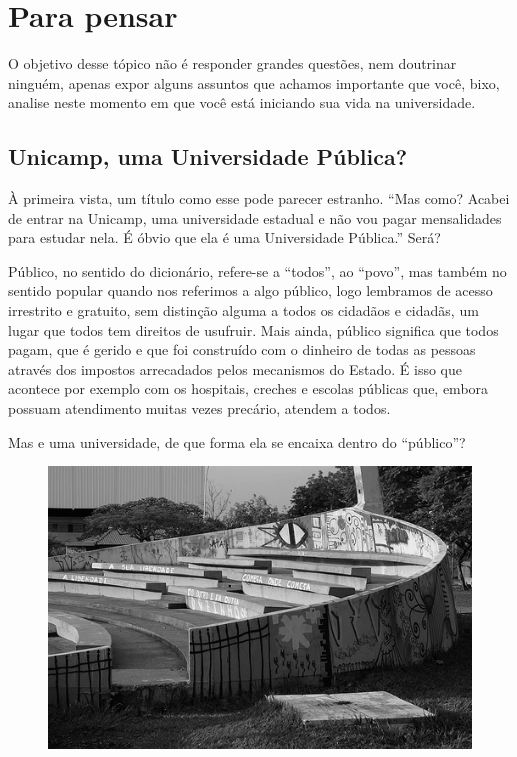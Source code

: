 
\section{Para pensar}

O objetivo desse tópico não é responder grandes questões, nem doutrinar ninguém,
apenas expor alguns assuntos que achamos importante que você, bixo, analise
neste momento em que você está iniciando sua vida na universidade.

\subsection*{Unicamp, uma Universidade Pública?}

À primeira vista, um título como esse pode parecer estranho. ``Mas como? Acabei
de entrar na Unicamp, uma universidade estadual e não vou pagar mensalidades
para estudar nela. É óbvio que ela é uma Universidade Pública.'' Será?

Público, no sentido do dicionário, refere-se a ``todos'', ao ``povo'', mas
também no sentido popular quando nos referimos a algo público, logo lembramos de
acesso irrestrito e gratuito, sem distinção alguma a todos os cidadãos e
cidadãs, um lugar que todos tem direitos de usufruir. Mais ainda, público
significa que todos pagam, que é gerido e que foi construído com o dinheiro de
todas as pessoas através dos impostos arrecadados pelos mecanismos do Estado. É
isso que acontece por exemplo com os hospitais, creches e escolas públicas que,
embora possuam atendimento muitas vezes precário, atendem a todos.

Mas e uma universidade, de que forma ela se encaixa dentro do ``público''?

\begin{figure}[h!]
    \centering
    \includegraphics[width=.45\textwidth]{img/ola_mundo/teatro_de_arena.jpg}
\end{figure}

